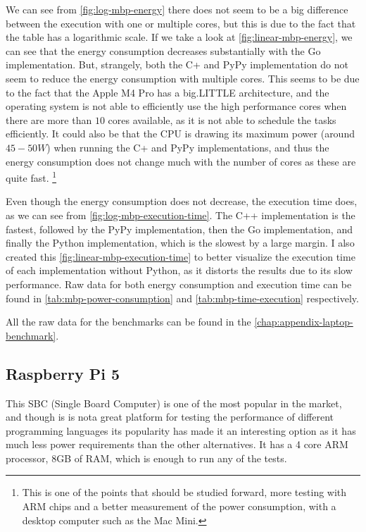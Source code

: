 We can see from \autoref{fig:log-mbp-energy} there does not seem to be a big difference between the execution with one or multiple cores, but this is due to the fact that the table has a logarithmic scale. If we take a look at \autoref{fig:linear-mbp-energy}, we can see that the energy consumption decreases substantially with the Go implementation. But, strangely, both the C\++ and PyPy implementation do not seem to reduce the energy consumption with multiple cores. This seems to be due to the fact that the Apple M4 Pro has a big.LITTLE architecture, and the operating system is not able to efficiently use the high performance cores when there are more than $10$ cores available, as it is not able to schedule the tasks efficiently. It could also be that the CPU is drawing its maximum power (around $45-50W$) when running the C\++ and PyPy implementations, and thus the energy consumption does not change much with the number of cores as these are quite fast. \footnote{This is one of the points that should be studied forward, more testing with ARM chips and a better measurement of the power consumption, with a desktop computer such as the Mac Mini.}



Even though the energy consumption does not decrease, the execution time does, as we can see from \autoref{fig:log-mbp-execution-time}. The C++ implementation is the fastest, followed by the PyPy implementation, then the Go implementation, and finally the Python implementation, which is the slowest by a large margin. I also created this \autoref{fig:linear-mbp-execution-time} to better visualize the execution time of each implementation without Python, as it distorts the results due to its slow performance. Raw data for both energy consumption and execution time can be found in \autoref{tab:mbp-power-consumption} and \autoref{tab:mbp-time-execution} respectively.

All the raw data for the benchmarks can be found in the \autoref{chap:appendix-laptop-benchmark}.

\subsection{Raspberry Pi 5}
This SBC (Single Board Computer) is one of the most popular in the market, and though is is nota great platform for testing the performance of different programming languages its popularity has made it an interesting option as it has much less power requirements than the other alternatives. It has a 4 core ARM processor, 8GB of RAM, which is enough to run any of the tests. 

